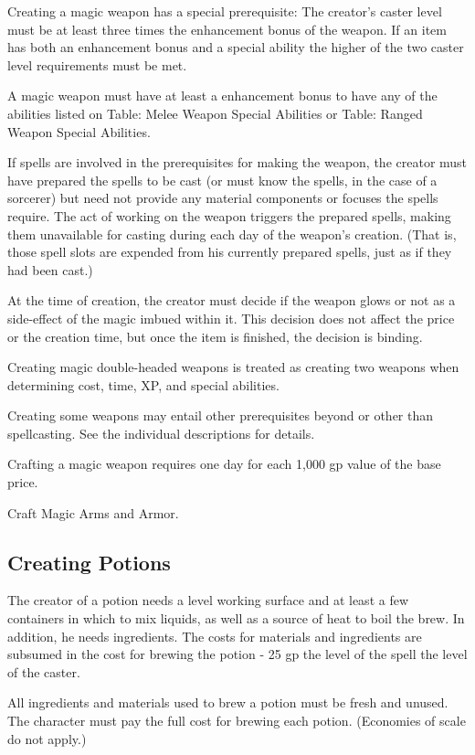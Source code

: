 Creating a magic weapon has a special prerequisite: The creator's caster level must be at least three times the enhancement bonus of the weapon. If an item has both an enhancement bonus and a special ability the higher of the two caster level requirements must be met.

A magic weapon must have at least a  enhancement bonus to have any of the abilities listed on Table: Melee Weapon Special Abilities or Table: Ranged Weapon Special Abilities.

If spells are involved in the prerequisites for making the weapon, the creator must have prepared the spells to be cast (or must know the spells, in the case of a sorcerer) but need not provide any material components or focuses the spells require. The act of working on the weapon triggers the prepared spells, making them unavailable for casting during each day of the weapon's creation. (That is, those spell slots are expended from his currently prepared spells, just as if they had been cast.)

At the time of creation, the creator must decide if the weapon glows or not as a side-effect of the magic imbued within it. This decision does not affect the price or the creation time, but once the item is finished, the decision is binding.

Creating magic double-headed weapons is treated as creating two weapons when determining cost, time, XP, and special abilities.

Creating some weapons may entail other prerequisites beyond or other than spellcasting. See the individual descriptions for details.

Crafting a magic weapon requires one day for each 1,000 gp value of the base price.

 Craft Magic Arms and Armor.

\subsection{Creating Potions}

The creator of a potion needs a level working surface and at least a few containers in which to mix liquids, as well as a source of heat to boil the brew. In addition, he needs ingredients. The costs for materials and ingredients are subsumed in the cost for brewing the potion - 25 gp \mtimes  the level of the spell \mtimes  the level of the caster.

All ingredients and materials used to brew a potion must be fresh and unused. The character must pay the full cost for brewing each potion. (Economies of scale do not apply.)

